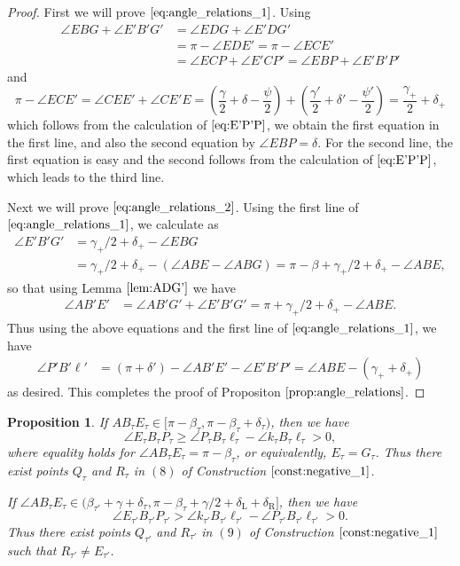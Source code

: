 \documentclass[11pt]{amsart}
\newtheorem{proposition}[theorem]{Proposition}
\numberwithin{equation}{section}
\numberwithin{theorem}{section}
\newcommand{\Lt}{\ensuremath{\mathrm{L}}}
\newcommand{\Rt}{\ensuremath{\mathrm{R}}}
\begin{document}
\begin{proof}
First we will prove $\eqref{eq:angle_relations_1}$.
Using
\begin{align*}
\angle EBG+\angle E'B'G'&=\angle EDG+\angle E'DG'\\
&=\pi -\angle EDE'=\pi -\angle ECE'\\
&=\angle ECP+\angle E'CP'=\angle EBP+\angle E'B'P'
\end{align*}
and
\begin{equation*}
\pi -\angle ECE'=\angle CEE' +\angle CE'E
=\left(\frac{\gamma}{2}+\delta -\frac{\psi}{2}\right) +\left(\frac{\gamma'}{2}+\delta'-\frac{\psi'}{2}\right) =\frac{\gamma_+}{2}+\delta_+
\end{equation*}
which follows from the calculation of $\eqref{eq:E'P'P}$, we obtain the first equation in the first line, and also the second equation by $\angle EBP=\delta$.
For the second line, the first equation is easy and the second follows from the calculation of $\eqref{eq:E'P'P}$, which leads to the third line.

Next we will prove $\eqref{eq:angle_relations_2}$.
Using the first line of $\eqref{eq:angle_relations_1}$, we calculate as
\begin{align*}
\angle E'B'G'&=\gamma_+/2+\delta_+-\angle EBG\\
&=\gamma_+/2+\delta_+-(\angle ABE -\angle ABG)=\pi -\beta +\gamma_+/2+\delta_+-\angle ABE,
\end{align*}
so that using Lemma $\ref{lem:ADG'}$ we have
\begin{align*}
\angle AB'E'&=\angle AB'G'+\angle E'B'G'=\pi +\gamma_+/2+\delta_+-\angle ABE.
\end{align*}
Thus using the above equations and the first line of $\eqref{eq:angle_relations_1}$, we have
\begin{align*}
\angle P'B'\ell'&=(\pi +\delta')-\angle AB'E'-\angle E'B'P'=\angle ABE-(\gamma_++\delta_+)
\end{align*}
as desired.
This completes the proof of Propositon $\ref{prop:angle_relations}$.
\end{proof}
\begin{proposition}\label{prop:existence_QR}
If $AB_\tau E_\tau\in [\pi -\beta_\tau ,\pi -\beta_\tau +\delta_\tau )$, then we have
\begin{equation*}
\angle E_\tau B_\tau P_\tau\geqslant\angle P_\tau B_\tau\ell_\tau -\angle k_\tau B_\tau\ell_\tau >0,
\end{equation*}
where equality holds for $\angle AB_\tau E_\tau =\pi -\beta_\tau$, or equivalently, $E_\tau =G_\tau$.
Thus there exist points $Q_\tau$ and $R_\tau$ in $(8)$ of Construction $\ref{const:negative_1}$.

If $\angle AB_\tau E_\tau\in (\beta_{\tau'}+\gamma +\delta_\tau ,\pi -\beta_\tau +\gamma /2+\delta_\Lt +\delta_\Rt ]$, then we have
\begin{equation*}
\angle E_{\tau'}B_{\tau'}P_{\tau'}>\angle k_{\tau'}B_{\tau'}\ell_{\tau'}-\angle P_{\tau'}B_{\tau'}\ell_{\tau'}>0.
\end{equation*}
Thus there exist points $Q_{\tau'}$ and $R_{\tau'}$ in $(9)$ of Construction $\ref{const:negative_1}$ such that $R_{\tau'}\neq E_{\tau'}$.
\end{proposition}
\end{document}

